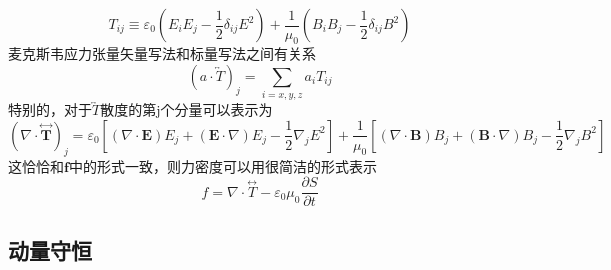         \begin{equation}
            T_{i j} \equiv \varepsilon_{0}\left(E_{i} E_{j}-\frac{1}{2} \delta_{i j} E^{2}\right)+\frac{1}{\mu_{0}}\left(B_{i} B_{j}-\frac{1}{2} \delta_{i j} B^{2}\right)
        \end{equation}
        麦克斯韦应力张量矢量写法和标量写法之间有关系
        \begin{equation}
            (a \cdot \overleftrightarrow{T})_{j}=\sum_{i=x, y, z} a_{i} T_{i j}
        \end{equation}
        特别的，对于$\overleftrightarrow{T}$散度的第j个分量可以表示为
        \begin{equation}
            (\nabla \cdot \stackrel{\leftrightarrow}{\boldsymbol{T}})_{j}=\varepsilon_{0}\left[(\nabla \cdot \boldsymbol{E}) E_{j}+(\boldsymbol{E} \cdot \nabla) E_{j}-\frac{1}{2} \nabla_{j} E^{2}\right]+\frac{1}{\mu_{0}}\left[(\nabla \cdot \boldsymbol{B}) B_{j}+(\boldsymbol{B} \cdot \nabla) B_{j}-\frac{1}{2} \nabla_{j} B^{2}\right]
        \end{equation}
        这恰恰和$\boldsymbol{f}$中的形式一致，则力密度可以用很简洁的形式表示
        \begin{equation}
            f=\nabla \cdot \stackrel{\leftrightarrow}{T}-\varepsilon_{0} \mu_{0} \frac{\partial S}{\partial t}
        \end{equation}
    \subsection{动量守恒}  
        